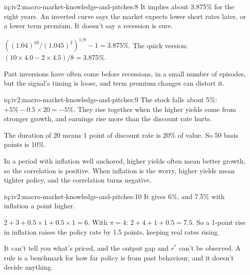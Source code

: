 \begin{solution}{iq:iv2:macro-market-knowledge-and-pitches:8}
It implies about 3.875\% for the eight years. An inverted curve says the market expects lower short rates later, or a lower term premium. It doesn't say a recession is sure.

$((1.04)^{10}/(1.045)^2)^{1/8} - 1 = 3.875\%$. The quick version: $(10 \times 4.0 - 2 \times 4.5)/8 = 3.875\%$.

Past inversions have often come before recessions, in a small number of episodes, but the signal's timing is loose, and term premium changes can distort it.

\end{solution}

\begin{solution}{iq:iv2:macro-market-knowledge-and-pitches:9}
The stock falls about 5\%: $+5\% - 0.5 \times 20 = -5\%$. They rise together when the higher yields come from stronger growth, and earnings rise more than the discount rate hurts.

The duration of 20 means 1 point of discount rate is 20\% of value. So 50 basis points is 10\%.

In a period with inflation well anchored, higher yields often mean better growth, so the correlation is positive. When inflation is the worry, higher yields mean tighter policy, and the correlation turns negative.

\end{solution}

\begin{solution}{iq:iv2:macro-market-knowledge-and-pitches:10}
It gives 6\%, and 7.5\% with inflation a point higher.

$2 + 3 + 0.5 \times 1 + 0.5 \times 1 = 6$. With $\pi = 4$: $2 + 4 + 1 + 0.5 = 7.5$. So a 1-point rise in inflation raises the policy rate by 1.5 points, keeping real rates rising.

It can't tell you what's priced, and the output gap and $r^*$ can't be observed. A rule is a benchmark for how far policy is from past behaviour, and it doesn't decide anything.

\end{solution}

